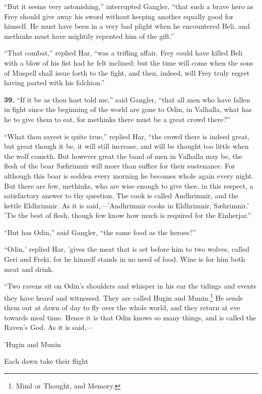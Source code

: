 ``But it seems very astonishing,'' interrupted Gangler, ``that such a
brave hero as Frey should give away his sword without keeping another
equally good for himself. He must have been in a very bad plight when
he encountered Beli, and methinks must have mightily repented him of
the gift.''

``That combat,'' replied Har, ``was a trifling affair. Frey could have
killed Beli with a blow of his fist had he felt inclined: but the time
will come when the sons of Muspell shall issue forth to the fight, and
then, indeed, will Frey truly regret having parted with his falchion.''


\textbf{39.} ``If it be as thou hast told me,'' said Gangler, ``that all men who
have fallen in fight since the beginning of the world are gone to
Odin, in Valhalla, what has he to give them to eat, for methinks there
must be a great crowd there?''

``What thou sayest is quite true,'' replied Har, ``the crowd there is
indeed great, but great though it be, it will still increase, and will
be thought too little when the wolf cometh. But however great the band
of men in Valhalla may be, the flesh of the boar Sæhrimnir will more
than suffice for their sustenance. For although this boar is sodden
every morning he becomes whole again every night. But there are few,
methinks, who are wise enough to give thee, in this respect, a
satisfactory answer to thy question. The cook is called Andhrimnir,
and the kettle Eldhrimnir. As it is said,—'Andhrimnir cooks in
Eldhrimnir, Sæhrimnir.' 'Tis the best of flesh, though few know how
much is required for the Einherjar.''

``But has Odin,'' said Gangler, ``the same food as the heroes?''

``Odin,' replied Har, 'gives the meat that is set before him to two
wolves, called Geri and Freki, for he himself stands in no need of
food. Wine is for him both meat and drink.

``Two ravens sit on Odin's shoulders and whisper in his ear the tidings
and events they have heard and witnessed. They are called Hugin and
Munin.\footnote{Mind or Thought, and Memory.} He sends them out at dawn of day to fly over the whole
world, and they return at eve towards meal time. Hence it is that Odin
knows so many things, and is called the Raven's God. As it is said,—

'Hugin and Munin

Each dawn take their flight

